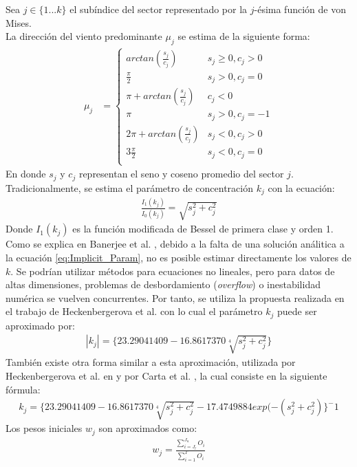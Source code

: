 Sea $j \in \{1 ... k\}$ el subíndice del sector representado por la $j$-ésima función de von Mises.\\
La dirección del viento predominante $\mu_j$ se estima de la siguiente forma:
\begin{align}\label{eq:Prevailing_Param}
    \mu_j &= 
        \left\{
            \begin{array}{ll}
                arctan(\frac{s_j}{c_j})  & s_j \geq 0, c_j > 0\\
                \frac{\pi}{2} & s_j > 0, c_j = 0\\
                \pi + arctan(\frac{s_j}{c_j}) & c_j < 0\\
                \pi & s_j > 0, c_j = -1\\
                2\pi + arctan(\frac{s_j}{c_j}) & s_j < 0, c_j > 0\\
                3\frac{\pi}{2} & s_j < 0, c_j = 0\\
            \end{array}
        \right.
\end{align}
En donde $s_j$ y $c_j$ representan el seno y coseno promedio del sector $j$.\\
Tradicionalmente, se estima el parámetro de concentración $k_j$ con la ecuación:
\begin{align}\label{eq:Implicit_Param}
    \frac{I_1(k_j)}{I_0(k_j)} = \sqrt{s_j^2 + c_j^2}
\end{align}
Donde $I_1(k_j)$ es la función modificada de Bessel de primera clase y orden 1.
 Como se explica en Banerjee et al. \cite{Banerjee05}, debido a la falta de una solución análitica a la ecuación \ref{eq:Implicit_Param}, no es posible estimar directamente los valores de $k$. Se podrían utilizar métodos para ecuaciones no lineales, pero para datos de altas dimensiones, problemas de desbordamiento (\emph{overflow}) o inestabilidad numérica se vuelven concurrentes. Por tanto, se utiliza la propuesta realizada en el trabajo de Heckenbergerova et al. \cite{Heckenbergerova15} con lo cual el parámetro $k_j$ puede ser aproximado por:\\
\begin{align}
    |k_j| = \{23.29041409 - 16.8617370\sqrt[4]{s_j^2 + c_j^2}\} 
\end{align}
También existe otra forma similar a esta aproximación, utilizada por  Heckenbergerova et al. en \cite{Heckenbergerova13} y por Carta et al. \cite{Carta07}, la cual consiste en 
la siguiente fórmula:\\
\begin{align}
    k_j = \{23.29041409 - 16.8617370\sqrt[4]{s_j^2 + c_j^2} - 17.4749884 exp(-(s_j^2 + c_j^2)\}^-1 
\end{align}
Los pesos iniciales $w_j$ son aproximados como: \\
\begin{align}\label{eq:Weight_Param}
    w_j = \frac{\sum_{i=J_l}^{J_u} O_i}{\sum_{i=1}^{T} O_i}
\end{align}

